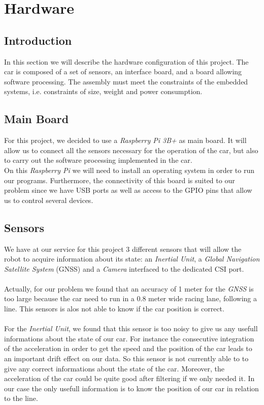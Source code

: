 \section{Hardware}

\subsection{Introduction}
In this section we will describe the hardware configuration of this project.
The car is composed of a set of sensors, an interface board, and a board allowing
software processing. The assembly must meet the constraints of the embedded
systems, i.e. constraints of size, weight and power consumption.

\subsection{Main Board}
For this project, we decided to use a \textit{Raspberry Pi 3B+}
as main board. It will allow us to connect all the sensors necessary for the
operation of the car, but also to carry out the software processing implemented in
the car. \\

On this \textit{Raspberry Pi} we will need to install an operating system in order
to run our programs. Furthermore, the connectivity of this board is suited to our
problem since we have USB ports as well as access to the GPIO pins that allow us
to control several devices.

\subsection{Sensors}
We have at our service for this project 3 different sensors that will allow the robot
to acquire information about its state: an \textit{Inertial Unit}, a 
\textit{Global Navigation Satellite System} (GNSS) and a \textit{Camera}
interfaced to the dedicated CSI port.

\paragraph{}
Actually, for our problem we found that an accuracy of 1 meter
for the \textit{GNSS} is too large because the car need to run in a 0.8 meter
wide racing lane, following a line. This sensors is alos not able to know if
the car position is correct.

\paragraph{}
For the \textit{Inertial Unit}, we found that this sensor is too noisy to
give us any usefull informations about the state of our car. For instance the
consecutive integration of the acceleration in order to get the speed and the
position of the car leads to an important drift effect on our data. So this
sensor is not currently able to to give any correct informations about the state
of the car. Moreover, the acceleration of the car could be quite good after filtering
if we only needed it. In our case the only usefull information is to know the
position of our car in relation to the line.

